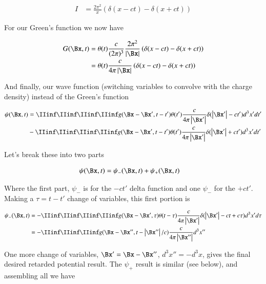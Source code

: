 \begin{align*}
I &= \frac{2 \pi^2 }{x} \left( \delta(x-c t) - \delta(x+c t) \right)
\end{align*}

For our Green's function we now have

\begin{align*}
G(\Bx, t)
&= \theta(t) \frac{c }{(2\pi)^3} \frac{2 \pi^2 }{\Abs{\Bx}} \left( \delta(x-c t) - \delta(x+c t) \right) \\
&= \theta(t) \frac{c }{4\pi \Abs{\Bx}} \left( \delta(x-c t) - \delta(x+c t) \right) \\
\end{align*}

And finally, our wave function (switching variables to convolve with the charge density) instead of the Green's function

\begin{align*}
{\psi}(\Bx, t)
&=
\IIinf \IIinf \IIinf \IIinf g(\Bx - \Bx', t - t') \theta(t') \frac{c }{4\pi \Abs{\Bx'}} \delta(\Abs{\Bx'} - c t') d^3 x' dt' \\
&-\IIinf \IIinf \IIinf \IIinf g(\Bx - \Bx', t - t') \theta(t') \frac{c }{4\pi \Abs{\Bx'}} \delta(\Abs{\Bx'} + c t') d^3 x' dt' \\
\end{align*}

Let's break these into two parts

\begin{align}\label{eqn:poisson:almostThere}
{\psi}(\Bx, t) &= {\psi}_{-}(\Bx, t) +{\psi}_{+}(\Bx, t)
\end{align}

Where the first part, $\psi_{-}$ is for the $-ct'$ delta function and one $\psi_{-}$ for the $+ct'$.
Making a $\tau = t-t'$ change of variables, this first portion is

\begin{align*}
{\psi}_{-}(\Bx, t)
&= -\IIinf \IIinf \IIinf \IIinf g(\Bx - \Bx', \tau) \theta(t-\tau) \frac{c }{4\pi \Abs{\Bx'}} \delta(\Abs{\Bx'} - c t + c\tau) d^3 x' d\tau \\
&= -\IIinf \IIinf \IIinf g(\Bx - \Bx'', t - \Abs{\Bx''}/c) \frac{c }{4\pi \Abs{\Bx''}} d^3 x'' \\
\end{align*}

One more change of variables, $\Bx' = \Bx - \Bx''$, $d^3 x'' = -d^3 x$, gives the final desired retarded potential result.  The $\psi_{+}$ result is similar (see below), and assembling all we have

